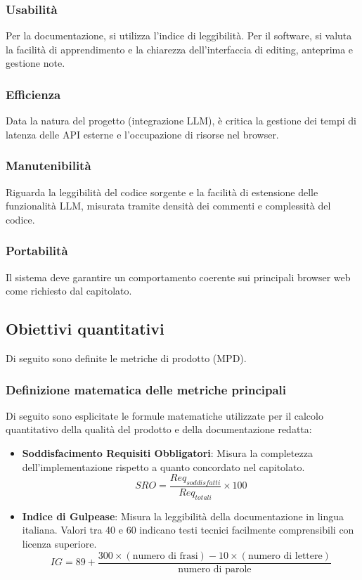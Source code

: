 \subsubsection{Usabilità}
Per la documentazione, si utilizza l'indice di leggibilità. Per il software, si valuta la facilità di apprendimento e la chiarezza dell'interfaccia di editing, anteprima e gestione note.

\subsubsection{Efficienza}
Data la natura del progetto (integrazione LLM), è critica la gestione dei tempi di latenza delle API esterne e l'occupazione di risorse nel browser.

\subsubsection{Manutenibilità}
Riguarda la leggibilità del codice sorgente e la facilità di estensione delle funzionalità LLM, misurata tramite densità dei commenti e complessità del codice.

\subsubsection{Portabilità}
Il sistema deve garantire un comportamento coerente sui principali browser web come richiesto dal capitolato.

\subsection{Obiettivi quantitativi}
Di seguito sono definite le metriche di prodotto (MPD).

\vspace{0.5cm}
\subsubsection*{Definizione matematica delle metriche principali}
Di seguito sono esplicitate le formule matematiche utilizzate per il calcolo quantitativo della qualità del prodotto e della documentazione redatta:

\begin{itemize}
    \item \textbf{Soddisfacimento Requisiti Obbligatori}: Misura la completezza dell'implementazione rispetto a quanto concordato nel capitolato.
    \[ SRO = \frac{Req_{soddisfatti}}{Req_{totali}} \times 100 \]
    \item \textbf{Indice di Gulpease}: Misura la leggibilità della documentazione in lingua italiana. Valori tra 40 e 60 indicano testi tecnici facilmente comprensibili con licenza superiore.
    \[ IG = 89 + \frac{300 \times (\text{numero di frasi}) - 10 \times (\text{numero di lettere})}{\text{numero di parole}} \]
\end{itemize}
\vspace{0.5cm}

